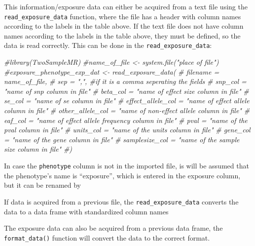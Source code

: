 \documentclass[
]{article}
\newenvironment{Shaded}{\begin{snugshade}}{\end{snugshade}}
\newcommand{\CommentTok}[1]{\textcolor[rgb]{0.56,0.35,0.01}{\textit{#1}}}
\begin{document}
This information/exposure data can either be acquired from a text file
using the \texttt{read\_exposure\_data} function, where the file has a
header with column names according to the labels in the table above. If
the text file does not have column names according to the labels in the
table above, they must be defined, so the data is read correctly. This
can be done in the \texttt{read\_exposure\_data}:

\begin{Shaded}
\begin{Highlighting}[]
\CommentTok{\#library(TwoSampleMR)}
\CommentTok{\#name\_of\_file \textless{}{-} system.file("place of file")}
\CommentTok{\#exposure\_phenotype\_exp\_dat \textless{}{-} read\_exposure\_data(}
\CommentTok{\#     filename = name\_of\_file,}
\CommentTok{\#     sep = ",", \#if it is a comma seperating the fields}
\CommentTok{\#     snp\_col = "name of snp column in file"}
\CommentTok{\#     beta\_col = "name of effect size column in file"}
\CommentTok{\#     se\_col = "name of se column in file"}
\CommentTok{\#     effect\_allele\_col = "name of effect allele column in file"}
\CommentTok{\#     other\_allele\_col = "name of non{-}effect allele column in file"}
\CommentTok{\#     eaf\_col = "name of effect allele frequency column in file"}
\CommentTok{\#     pval = "name of the pval column in file"}
\CommentTok{\#     units\_col = "name of the units column in file"}
\CommentTok{\#     gene\_col = "name of the gene column in file"}
\CommentTok{\#     samplesize\_col = "name of the sample size column in file"}
\CommentTok{\#)}
\end{Highlighting}
\end{Shaded}

In case the \texttt{phenotype} column is not in the imported file, is
will be assumed that the phenotype's name is ``exposure'', which is
entered in the exposure column, but it can be renamed by

\begin{Shaded}
\end{Shaded}

If data is acquired from a previous file, the
\texttt{read\_exposure\_data} converts the data to a data frame with
standardized column names

The exposure data can also be acquired from a previous data frame, the
\texttt{format\_data()} function will convert the data to the correct
format.
\end{document}
